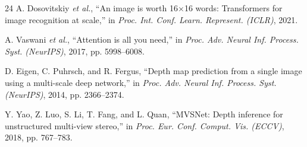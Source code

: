 \documentclass[10pt]{article}
\begin{document}
\begin{thebibliography}{24}
A. Dosovitskiy \textit{et al.},
``An image is worth 16$\times$16 words: Transformers for image recognition at
scale,'' in \textit{Proc. Int. Conf. Learn. Represent. (ICLR)}, 2021.

A. Vaswani \textit{et al.},
``Attention is all you need,'' in \textit{Proc. Adv. Neural Inf. Process.
Syst. (NeurIPS)}, 2017, pp. 5998--6008.

D. Eigen, C. Puhrsch, and R. Fergus,
``Depth map prediction from a single image using a multi-scale deep network,''
in \textit{Proc. Adv. Neural Inf. Process. Syst. (NeurIPS)}, 2014,
pp. 2366--2374.

Y. Yao, Z. Luo, S. Li, T. Fang, and L. Quan,
``{MVSNet}: Depth inference for unstructured multi-view stereo,'' in
\textit{Proc. Eur. Conf. Comput. Vis. (ECCV)}, 2018, pp. 767--783.

\end{thebibliography}
\end{document}
